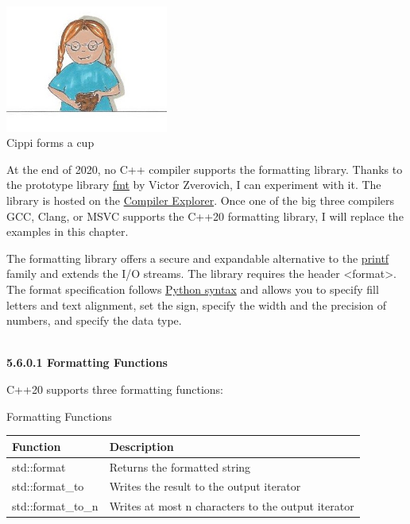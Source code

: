\begin{center}
\includegraphics[width=0.4\textwidth]{content/3/chapter5/images/29.png}\\
Cippi forms a cup
\end{center}

\begin{tcolorbox}[colback=blue!5!white,colframe=blue!75!black,title={Lack of Compiler Support}]
	
At the end of 2020, no C++ compiler supports the formatting library. Thanks to the prototype library \href{https://github.com/fmtlib/fmt}{fmt} by Victor Zverovich, I can experiment with it. The library is hosted on the \href{https://godbolt.org/z/Eq5763}{Compiler Explorer}. Once one of the big three compilers GCC, Clang, or MSVC supports the C++20 formatting library, I will replace the examples in this chapter.
	
\end{tcolorbox}

The formatting library offers a secure and expandable alternative to the \href{https://en.cppreference.com/w/cpp/io/c/fprintf}{printf} family and extends the I/O streams. The library requires the header <format>. The format specification follows \href{https://docs.python.org/3/library/stdtypes.html#str.format}{Python syntax} and allows you to specify fill letters and text alignment, set the sign, specify the width and the precision of numbers, and specify the data type.


\hspace*{\fill} \\ %
\noindent
\textbf{5.6.0.1\hspace{0.2cm} Formatting Functions}

C++20 supports three formatting functions:

\begin{center}
Formatting Functions
\end{center}

\begin{table}[H]
\centering
\begin{tabular}{ll}
\textbf{Function}  & \textbf{Description}                               \\ \hline
std::format        & Returns the formatted string                       \\
std::format\_to    & Writes the result to the output iterator           \\
std::format\_to\_n & Writes at most n characters to the output iterator
\end{tabular}
\end{table}

